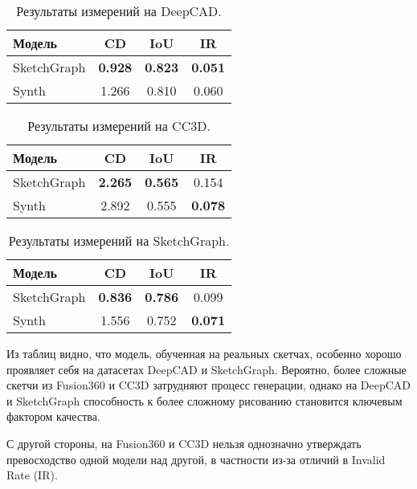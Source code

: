 \begin{table}[h!]
    \centering
    \begin{tabular}{lccc}
        \toprule
        \textbf{Модель} & \textbf{CD}    & \textbf{IoU}   & \textbf{IR}    \\
        \midrule
        SketchGraph     & \textbf{0.928} & \textbf{0.823} & \textbf{0.051} \\
        Synth           & 1.266          & 0.810          & 0.060          \\
        \bottomrule
    \end{tabular}
    \caption{Результаты измерений на DeepCAD.}
\end{table}

\begin{table}[h!]
    \centering
    \begin{tabular}{lccc}
        \toprule
        \textbf{Модель} & \textbf{CD}    & \textbf{IoU}   & \textbf{IR}    \\
        \midrule
        SketchGraph     & \textbf{2.265} & \textbf{0.565} & 0.154          \\
        Synth           & 2.892          & 0.555          & \textbf{0.078} \\
        \bottomrule
    \end{tabular}
    \caption{Результаты измерений на CC3D.}
\end{table}

\begin{table}[h!]
    \centering
    \begin{tabular}{lccc}
        \toprule
        \textbf{Модель} & \textbf{CD}    & \textbf{IoU}   & \textbf{IR}    \\
        \midrule
        SketchGraph     & \textbf{0.836} & \textbf{0.786} & 0.099          \\
        Synth           & 1.556          & 0.752          & \textbf{0.071} \\
        \bottomrule
    \end{tabular}
    \caption{Результаты измерений на SketchGraph.}
\end{table}

Из таблиц видно, что модель, обученная на реальных скетчах, особенно хорошо проявляет себя на датасетах DeepCAD и SketchGraph. Вероятно, более сложные скетчи из Fusion360 и CC3D затрудняют процесс генерации, однако на DeepCAD и SketchGraph способность к более сложному рисованию становится ключевым фактором качества.

С другой стороны, на Fusion360 и CC3D нельзя однозначно утверждать превосходство одной модели над другой, в частности из-за отличий в Invalid Rate (IR).

